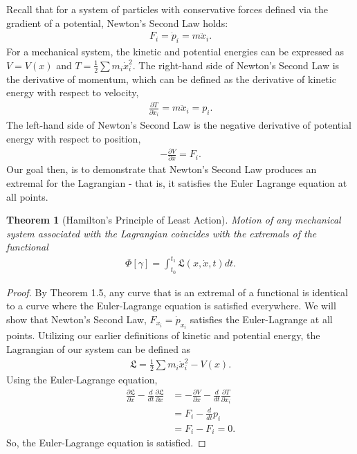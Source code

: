 \documentclass[10.5pt, psamsfonts]{amsart}
\newtheorem{thm}{Theorem}[section]
\theoremstyle{definition}
\theoremstyle{remark}
\numberwithin{equation}{section}
\begin{document}
Recall that for a system of particles with conservative forces defined via the gradient of a potential, Newton's Second Law holds:
\begin{align*}
  F_i = \dot{p}_i = m \ddot{x}_i. 
\end{align*}
For a mechanical system, the kinetic and potential energies can be expressed as $V = V(x)$ and $T = \frac{1}{2} \sum m_i \dot{x}_i^2$.
The right-hand side of Newton's Second Law is the derivative of momentum, which can be defined as the derivative of kinetic energy with respect to velocity,
\begin{align*}
  \frac{\partial T }{\partial \dot{x}_i} = m\ddot{x}_i = p_i.
\end{align*}
The left-hand side of Newton's Second Law is the negative derivative of potential energy with respect to position,
\begin{align*}
  -\frac{\partial V}{\partial x} = F_i.
 \end{align*}
Our goal then, is to demonstrate that Newton's Second Law produces an extremal for the Lagrangian - that is, it satisfies the Euler Lagrange equation at all points.

\begin{thm}[Hamilton's Principle of Least Action]
Motion of any mechanical system associated with the Lagrangian coincides with the extremals of the functional
\begin{align*}
  \Phi[\gamma] = \int_{t_0}^{t_1} \mathfrak{L}  (x, \dot{x}, t)dt.
\end{align*}
\end{thm}

\begin{proof}
By Theorem 1.5, any curve that is an extremal of a functional is identical to a curve where the Euler-Lagrange equation is satisfied everywhere. We will show that Newton's Second Law, $F_{x_i} = \dot{p}_{x_i}$ satisfies the Euler-Lagrange at all points. Utilizing our earlier definitions of kinetic and potential energy, the Lagrangian of our system can be defined as
\begin{align*}
  \mathfrak{L} = \frac{1}{2} \sum m_i \dot{x}_i^2 - V(x).
\end{align*}
Using the Euler-Lagrange equation,
\begin{align*}
  \frac{\partial \mathfrak{L}}{\partial x} - \frac{d}{dt} \frac{\partial \mathfrak{L}}{\partial \dot{x}} &= -\frac{\partial V}{\partial x} - \frac{d}{dt} \frac{\partial T}{\partial \dot{x}_i}  \\
  &= F_i - \frac{d}{dt}p_i \\
  &= F_i - F_i = 0.
\end{align*}
So, the Euler-Lagrange equation is satisfied.
\end{proof}
\end{document}
